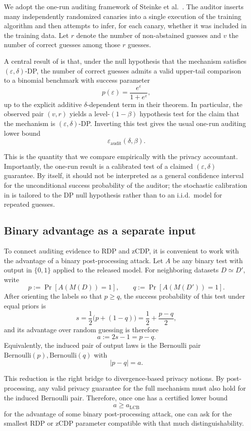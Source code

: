 \documentclass[10pt]{article}
\newcommand{\eps}{\varepsilon}
\newcommand{\del}{\delta}
\newcommand{\Bern}{\mathrm{Bernoulli}}
\begin{document}
We adopt the one-run auditing framework of Steinke et al.~\cite{steinke2023privacy}. The auditor inserts many independently randomized canaries into a single execution of the training algorithm and then attempts to infer, for each canary, whether it was included in the training data. Let $r$ denote the number of non-abstained guesses and $v$ the number of correct guesses among those $r$ guesses.

A central result of \cite{steinke2023privacy} is that, under the null hypothesis that the mechanism satisfies $(\eps,\del)$-DP, the number of correct guesses admits a valid upper-tail comparison to a binomial benchmark with success parameter
\[
p(\eps)=\frac{e^\eps}{1+e^\eps},
\]
up to the explicit additive $\del$-dependent term in their theorem. In particular, the observed pair $(v,r)$ yields a level-$(1-\beta)$ hypothesis test for the claim that the mechanism is $(\eps,\del)$-DP. Inverting this test gives the usual one-run auditing lower bound
\[
\eps_{\mathrm{audit}}(\del,\beta).
\]

This is the quantity that we compare empirically with the privacy accountant. Importantly, the one-run result is a calibrated test of a claimed $(\eps,\del)$ guarantee. By itself, it should not be interpreted as a general confidence interval for the unconditional success probability of the auditor; the stochastic calibration in \cite{steinke2023privacy} is tailored to the DP null hypothesis rather than to an i.i.d.\ model for repeated guesses.

\subsection{Binary advantage as a separate input}

To connect auditing evidence to RDP and zCDP, it is convenient to work with the advantage of a binary post-processing attack. Let $A$ be any binary test with output in $\{0,1\}$ applied to the released model. For neighboring datasets $D \simeq D'$, write
\[
p := \Pr[A(M(D))=1],
\qquad
q := \Pr[A(M(D'))=1].
\]
After orienting the labels so that $p \ge q$, the success probability of this test under equal priors is
\[
s=\frac{1}{2}\bigl(p+(1-q)\bigr)=\frac{1}{2}+\frac{p-q}{2},
\]
and its advantage over random guessing is therefore
\[
a:=2s-1=p-q.
\]
Equivalently, the induced pair of output laws is the Bernoulli pair $\Bern(p),\Bern(q)$ with
\[
|p-q|=a.
\]

This reduction is the right bridge to divergence-based privacy notions. By post-processing, any valid privacy guarantee for the full mechanism must also hold for the induced Bernoulli pair. Therefore, once one has a certified lower bound
\[
a \ge a_{\mathrm{LCB}}
\]
for the advantage of some binary post-processing attack, one can ask for the smallest RDP or zCDP parameter compatible with that much distinguishability.
\end{document}
